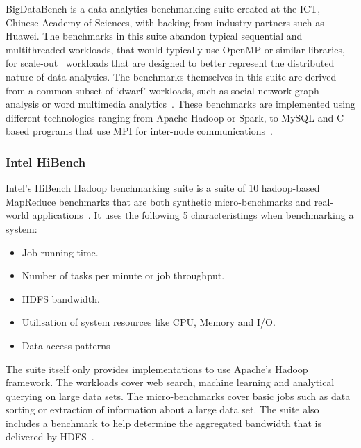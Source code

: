 \documentclass[12pt,a4paper]{article}
\begin{document}
            	BigDataBench is a data analytics benchmarking suite created at the ICT, Chinese Academy of Sciences, with backing from industry partners such as Huawei. The benchmarks in this suite abandon typical sequential and multithreaded workloads, that would typically use OpenMP or similar libraries, for scale-out~\cite{big-data-bench-home} workloads that are designed to better represent the distributed nature of data analytics. The benchmarks themselves in this suite are derived from a common subset of `dwarf' workloads, such as social network graph analysis or word multimedia analytics~\cite{dwarf-workloads-big-data}. These benchmarks are implemented using different technologies ranging from Apache Hadoop or Spark, to MySQL and C-based programs that use MPI for inter-node communications~\cite{big-data-bench-home}.
            
            \subsubsection{Intel HiBench}
            \label{ssub:intel_hibench}

                Intel's HiBench Hadoop benchmarking suite is a suite of 10 hadoop-based MapReduce benchmarks that are both synthetic micro-benchmarks and real-world applications~\cite{hibench-techreport}. It uses the following 5 characteristings when benchmarking a system:

                \begin{itemize}
                    \item Job running time.
                    \item Number of tasks per minute or job throughput.
                    \item HDFS bandwidth.
                    \item Utilisation of system resources like CPU, Memory and I/O.
                    \item Data access patterns
                \end{itemize}

                The suite itself only provides implementations to use Apache's Hadoop framework. The workloads cover web search, machine learning and analytical querying on large data sets. The micro-benchmarks cover basic jobs such as data sorting or extraction of information about a large data set. The suite also includes a benchmark to help determine the aggregated bandwidth that is delivered by HDFS~\cite{hibench-techreport-2}.
            
\end{document}
